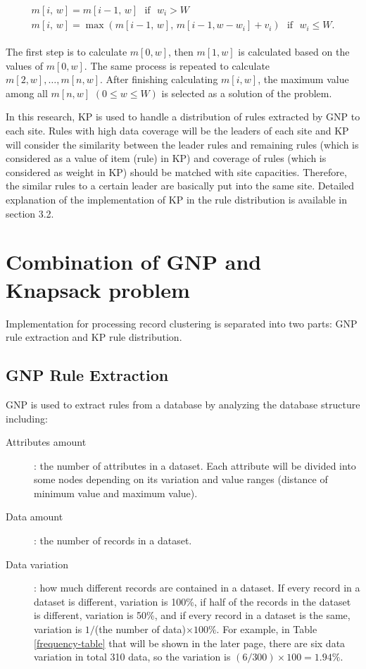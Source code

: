 \documentclass{elsart}
\begin{document}
\begin{eqnarray}
\begin{array}{lll}
    m[i,\,w]=m[i-1,\,w] \text{~~if~~} w_i > W\,\! \\
    m[i,\,w]=\max(m[i-1,\,w],\,m[i-1,w-w_i]+v_i) \text{~~if~~} w_i \leqslant W.
\end{array}
\label{eq:knapsack-problem1}
\end{eqnarray}

The first step is to calculate $m[0,w]$, then $m[1,w]$ is calculated based on the values of $m[0,w]$.
The same process is repeated to calculate $m[2,w], \dots, m[n,w]$.
After finishing calculating $m[i,w]$, the maximum value among all $m[n,w]$ $(0 \leq w \leq W)$ is selected as a solution of the problem.

In this research, KP is used to handle a distribution of rules extracted by GNP to each site. Rules with high data coverage will be the leaders of each site and KP will consider the similarity between the leader rules and remaining rules (which is considered as a value of item (rule) in KP) and coverage of rules (which is considered as weight in KP) should be matched with site capacities. Therefore, the similar rules to a certain leader are basically put into the same site.
Detailed explanation of the implementation of KP in the rule distribution is available in section 3.2.


\section{Combination of GNP and Knapsack problem}

Implementation for processing record clustering is separated into two parts: GNP rule extraction and KP rule distribution.

\subsection{GNP Rule Extraction\label{sec:gnp-rule-extraction}}

GNP is used to extract rules from a database by analyzing the database structure including:
\begin{description}
\item [Attributes amount]: the number of attributes in a dataset. Each attribute will be divided into some nodes depending on its variation and value ranges (distance of minimum value and maximum value). 
\item [Data amount]: the number of records in a dataset.
\item [Data variation]: how much different records are contained in a dataset. If every record in a dataset is different, variation is 100\%, if half of the records in the dataset is different, variation is 50\%, and if every record in a dataset is the same, variation is $1/$(the number of data)$ \times 100\%$. For example, in Table \ref{frequency-table} that will be shown in the later page, there are six data variation in total 310 data, so the variation is $(6/300)\times100=1.94\%$.
\end{description}
\end{document}

